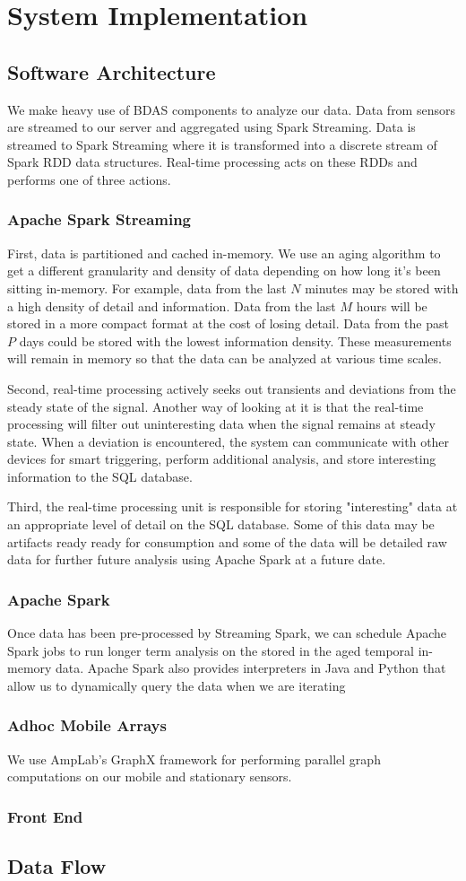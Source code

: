 \chapter{System Implementation}
\section{Software Architecture}
We make heavy use of BDAS components to analyze our data. Data from sensors are streamed to our server and aggregated using Spark Streaming. Data is streamed to Spark Streaming where it is transformed into a discrete stream of Spark  RDD data structures. Real-time processing acts on these RDDs and performs one of three actions. 

\subsection{Apache Spark Streaming}
First, data is partitioned and cached in-memory. We use an aging algorithm to get a different granularity and density of data depending on how long it's been sitting in-memory. For example, data from the last $N$ minutes may be stored with a high density of detail and information. Data from the last $M$ hours will be stored in a more compact format at the cost of losing detail. Data from the past $P$ days could be stored with the lowest information density. These measurements will remain in memory so that the data can be analyzed at various time scales.

Second, real-time processing actively seeks out transients and deviations from the steady state of the signal. Another way of looking at it is that the real-time processing will filter out uninteresting data when the signal remains at steady state. When a deviation is encountered, the system can communicate with other devices for smart triggering, perform additional analysis, and store interesting information to the SQL database. 

Third, the real-time processing unit is responsible for storing "interesting" data at an appropriate level of detail on the SQL database. Some of this data may be artifacts ready ready for consumption and some of the data will be detailed raw data for further future analysis using Apache Spark at a future date.

\subsection{Apache Spark}
Once data has been pre-processed by Streaming Spark, we can schedule Apache Spark jobs to run longer term analysis on the stored in the aged temporal in-memory data. Apache Spark also provides interpreters in Java and Python that allow us to dynamically query the data when we are iterating 

\subsection{Adhoc Mobile Arrays}
We use AmpLab's GraphX framework for performing parallel graph computations on our mobile and stationary sensors.

\subsection{Front End}


\section{Data Flow}

